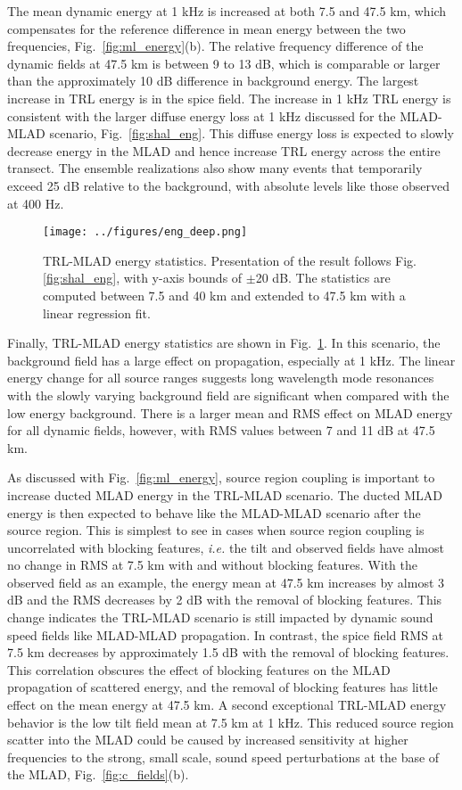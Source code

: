 \documentclass[preprint,NumberedRefs]{JASA}
\begin{document}
The mean dynamic energy at 1 kHz is increased at both 7.5 and 47.5 km, which compensates for the reference difference in mean energy between the two frequencies, Fig.~\ref{fig:ml_energy}(b). The relative frequency difference of the dynamic fields at 47.5 km is between 9 to 13 dB, which is comparable or larger than the approximately 10 dB difference in background energy. The largest increase in TRL energy is in the spice field. The increase in 1 kHz TRL energy is consistent with the larger diffuse energy loss at 1 kHz discussed for the MLAD-MLAD scenario, Fig.~\ref{fig:shal_eng}. This diffuse energy loss is expected to slowly decrease energy in the MLAD and hence increase TRL energy across the entire transect. The ensemble realizations also show many events that temporarily exceed 25 dB relative to the background, with absolute levels like those observed at 400 Hz.

\begin{figure}
\texttt{[image: ../figures/eng\_deep.png]}
    \caption{TRL-MLAD energy statistics. Presentation of the result follows Fig. \ref{fig:shal_eng}, with y-axis bounds of $\pm$20 dB. The statistics are computed between 7.5 and 40 km and extended to 47.5 km with a linear regression fit.}
    \label{fig:deep_eng}
\end{figure}
Finally, TRL-MLAD energy statistics are shown in Fig.~\ref{fig:deep_eng}. In this scenario, the background field has a large effect on propagation, especially at 1 kHz. The linear energy change for all source ranges suggests long wavelength mode resonances with the slowly varying background field\cite{colosi21} are significant when compared with the low energy background. There is a larger mean and RMS effect on MLAD energy for all dynamic fields, however, with RMS values between 7 and 11 dB at 47.5 km.

As discussed with Fig.~\ref{fig:ml_energy}, source region coupling is important to increase ducted MLAD energy in the TRL-MLAD scenario. The ducted MLAD energy is then expected to behave like the MLAD-MLAD scenario after the source region. This is simplest to see in cases when source region coupling is uncorrelated with blocking features, \emph{i.e.} the tilt and observed fields have almost no change in RMS at 7.5 km with and without blocking features. With the observed field as an example, the energy mean at 47.5 km increases by almost 3 dB and the RMS decreases by 2 dB with the removal of blocking features. This change indicates the TRL-MLAD scenario is still impacted by dynamic sound speed fields like MLAD-MLAD propagation. In contrast, the spice field RMS at 7.5 km decreases by approximately 1.5 dB with the removal of blocking features. This correlation obscures the effect of blocking features on the MLAD propagation of scattered energy, and the removal of blocking features has little effect on the mean energy at 47.5 km. A second exceptional TRL-MLAD energy behavior is the low tilt field mean at 7.5 km at 1 kHz. This reduced source region scatter into the MLAD could be caused by increased sensitivity at higher frequencies to the strong, small scale, sound speed perturbations at the base of the MLAD, Fig.~\ref{fig:c_fields}(b).
\end{document}
